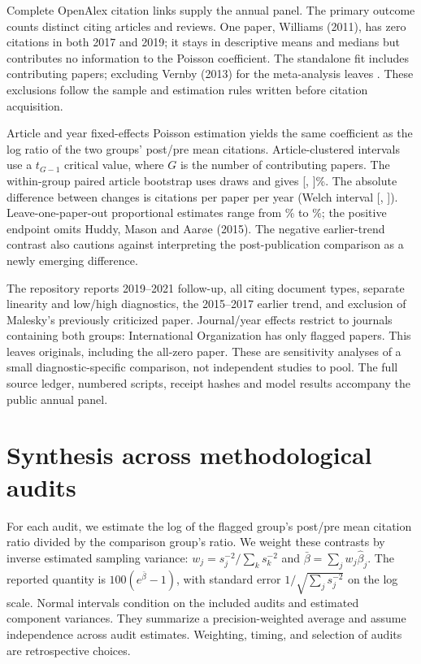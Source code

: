 \documentclass[11pt,letterpaper]{article}
\begin{document}
Complete OpenAlex citation links supply the annual panel. The primary outcome counts distinct citing articles and reviews. One paper, Williams (2011), has zero citations in both 2017 and 2019; it stays in descriptive means and medians but contributes no information to the Poisson coefficient. The standalone fit includes \HmxContributing{} contributing papers; excluding Vernby (2013) for the meta-analysis leaves \HmxMetaContributing{}. These exclusions follow the sample and estimation rules written before citation acquisition.

Article and year fixed-effects Poisson estimation yields the same coefficient as the log ratio of the two groups' post/pre mean citations. Article-clustered intervals use a $t_{G-1}$ critical value, where $G$ is the number of contributing papers. The within-group paired article bootstrap uses \BootstrapDraws{} draws and gives [\HmxBootLower, \HmxBootUpper]\%. The absolute difference between changes is \HmxAbsolute{} citations per paper per year (Welch interval [\HmxAbsoluteLower, \HmxAbsoluteUpper]). Leave-one-paper-out proportional estimates range from \HmxLooMin\% to \HmxLooMax\%; the positive endpoint omits Huddy, Mason and Aar\o e (2015). The negative earlier-trend contrast also cautions against interpreting the post-publication comparison as a newly emerging difference.

The repository reports 2019--2021 follow-up, all citing document types, separate linearity and low/high diagnostics, the 2015--2017 earlier trend, and exclusion of Malesky's previously criticized paper. Journal/year effects restrict to journals containing both groups: International Organization has only flagged papers. This leaves \AuditHmxJournalPapers{} originals, including the all-zero paper. These are sensitivity analyses of a small diagnostic-specific comparison, not independent studies to pool. The full source ledger, numbered scripts, receipt hashes and model results accompany the public annual panel.

\section{Synthesis across methodological audits}\label{app:synthesis}
For each audit, we estimate the log of the flagged group's post/pre mean citation ratio divided by the comparison group's ratio. We weight these contrasts by inverse estimated sampling variance: $w_j=s_j^{-2}/\sum_k s_k^{-2}$ and $\bar\beta=\sum_j w_j\widehat\beta_j$. The reported quantity is $100(e^{\bar\beta}-1)$, with standard error $1/\sqrt{\sum_j s_j^{-2}}$ on the log scale. Normal intervals condition on the included audits and estimated component variances. They summarize a precision-weighted average and assume independence across audit estimates. Weighting, timing, and selection of audits are retrospective choices.
\end{document}
